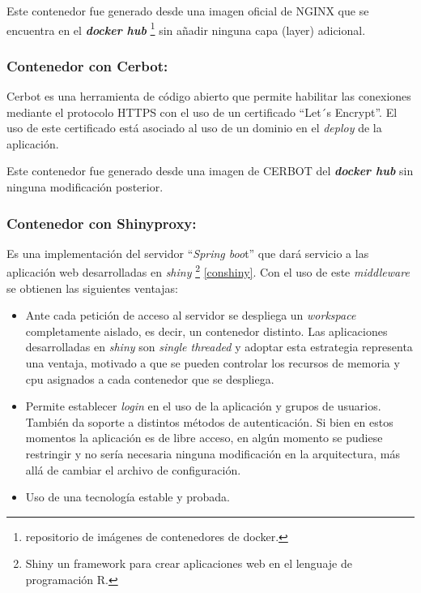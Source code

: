 \documentclass[
  10,
  spanish,
  openany]{book}
\begin{document}
Este contenedor fue generado desde una imagen oficial de NGINX que se encuentra en el \textbf{\emph{docker hub}} \footnote{repositorio de imágenes de contenedores de docker.} sin añadir ninguna capa (layer) adicional.

\hypertarget{contenedor-con-cerbot}{%
\subsubsection{Contenedor con Cerbot:}\label{contenedor-con-cerbot}}

Cerbot es una herramienta de código abierto que permite habilitar las conexiones mediante el protocolo HTTPS con el uso de un certificado ``Let´s Encrypt''. El uso de este certificado está asociado al uso de un dominio en el \emph{deploy} de la aplicación.

Este contenedor fue generado desde una imagen de CERBOT del \textbf{\emph{docker hub}} sin ninguna modificación posterior.

\hypertarget{conshinyproxy}{%
\subsubsection{Contenedor con Shinyproxy:}\label{conshinyproxy}}

Es una implementación del servidor ``\emph{Spring boo}t'' que dará servicio a las aplicación web desarrolladas en \emph{shiny} \footnote{Shiny un framework para crear aplicaciones web en el lenguaje de programación R.} \ref{conshiny}. Con el uso de este \emph{middleware} se obtienen las siguientes ventajas:

\begin{itemize}
\item
  Ante cada petición de acceso al servidor se despliega un \emph{workspace} completamente aislado, es decir, un contenedor distinto. Las aplicaciones desarrolladas en \emph{shiny} son \emph{single threaded} y adoptar esta estrategia representa una ventaja, motivado a que se pueden controlar los recursos de memoria y cpu asignados a cada contenedor que se despliega.
\item
  Permite establecer \emph{login} en el uso de la aplicación y grupos de usuarios. También da soporte a distintos métodos de autenticación. Si bien en estos momentos la aplicación es de libre acceso, en algún momento se pudiese restringir y no sería necesaria ninguna modificación en la arquitectura, más allá de cambiar el archivo de configuración.
\item
  Uso de una tecnología estable y probada.
\end{itemize}
\end{document}
